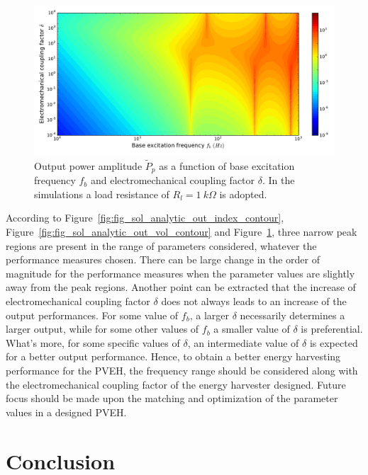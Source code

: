 \documentclass{svjour3}                     %
\begin{document}
\begin{figure}[!htbp]
    \centering
    \includegraphics[width=\textwidth]{./img_eig_asy/fig_sol_analytic_out_pow_contour}
    \caption{ Output power amplitude $\tilde{P}_p$ as a function of base excitation frequency $f_b$ and electromechanical coupling factor $\delta$. In the simulations a load resistance of $R_l = 1\ k\Omega$ is adopted.}
    \label{fig:fig_sol_analytic_out_pow_contour}
\end{figure}


According to Figure~\ref{fig:fig_sol_analytic_out_index_contour}, Figure~\ref{fig:fig_sol_analytic_out_vol_contour} and Figure~\ref{fig:fig_sol_analytic_out_pow_contour}, three narrow peak regions are present in the range of parameters considered, whatever the performance measures chosen. There can be large change in the order of magnitude for the performance measures when the parameter values are slightly away from the peak regions. Another point can be extracted that the increase of electromechanical coupling factor $\delta$ does not always leads to an increase of the output performances. For some value of $f_b$, a larger $\delta$ necessarily determines a larger output, while for some other values of $f_b$ a smaller value of $\delta$ is preferential. What's more, for some specific values of $\delta$, an intermediate value of $\delta$ is expected for a better output performance. Hence, to obtain a better energy harvesting performance for the PVEH, the frequency range should be considered along with the electromechanical coupling factor of the energy harvester designed. Future focus should be made upon the matching and optimization of the parameter values in a designed PVEH.


\section{Conclusion}
\end{document}
